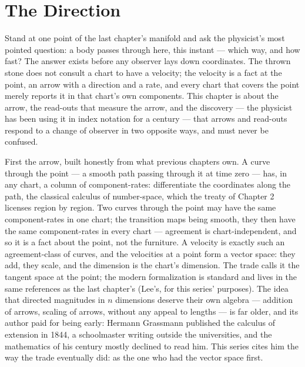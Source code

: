 \chapter{The Direction}

Stand at one point of the last chapter's manifold and ask the physicist's
most pointed question: a body passes through here, this instant --- which
way, and how fast? The answer exists before any observer lays down
coordinates. The thrown stone does not consult a chart to have a velocity;
the velocity is a fact at the point, an arrow with a direction and a rate,
and every chart that covers the point merely reports it in that chart's own
components. This chapter is about the arrow, the read-outs that measure the
arrow, and the discovery --- the physicist has been using it in index
notation for a century --- that arrows and read-outs respond to a change of
observer in two opposite ways, and must never be confused.

First the arrow, built honestly from what previous chapters own. A curve
through the point --- a smooth path passing through it at time zero --- has,
in any chart, a column of component-rates: differentiate the coordinates
along the path, the classical calculus of number-space, which the treaty of
Chapter 2 licenses region by region. Two curves through the point may have
the same component-rates in one chart; the transition maps being smooth,
they then have the same component-rates in every chart --- agreement is
chart-independent, and so it is a fact about the point, not the furniture.
A velocity is exactly such an agreement-class of curves, and the velocities
at a point form a vector space: they add, they scale, and the dimension is
the chart's dimension. The trade calls it the tangent space at the point;
the modern formalization is standard and lives in the same references as
the last chapter's (Lee's, for this series' purposes). The idea that
directed magnitudes in $n$ dimensions deserve their own algebra --- addition
of arrows, scaling of arrows, without any appeal to lengths --- is far
older, and its author paid for being early: Hermann Grassmann published the
calculus of extension in 1844, a schoolmaster writing outside the
universities, and the mathematics of his century mostly declined to read
him. This series cites him the way the trade eventually did: as the one who
had the vector space first.

